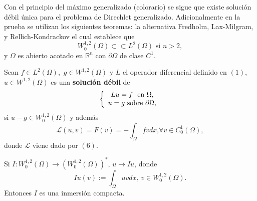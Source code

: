 
%
Con el principio del m\'{a}ximo generalizado (colorario) se sigue que
\linebreak existe soluci\'{o}n d\'{e}bil \'{u}nica para el problema de
Direchlet generalizado. Adicionalmente en la prueba se utilizan los siguientes
teoremas: la alternativa Fredholm, Lax-Milgram, y Rellich-Kondrackov el cual
establece que
\[
W_{0}^{1,2}\left(  \Omega\right)  \subset\subset L^{2}\left(  \Omega\right)
\text{ \ si }n>2,
\]
y $\Omega$ es abierto acotado en $\mathbb{R}^{n}$ con $\partial\Omega$ de
clase $C^{1}$.

\begin{definition}
Sean $f\in L^{2}\left(  \Omega\right)  ,$ $g\in W^{1,2}\left(  \Omega\right)
$ y $L$ el operador diferencial definido en $\left(  1\right)  $, $u\in
W^{1,2}\left(  \Omega\right)  $ es una \textbf{soluci\'{o}n d\'{e}bil} de
\[
\left\{
\begin{array}
[c]{c}%
Lu=f\text{ \ en }\Omega,\\
u=g\text{ sobre }\partial\Omega,
\end{array}
\right.
\]
si $u-g\in W_{0}^{1,2}\left(  \Omega\right)  $ y adem\'{a}s
\begin{equation}
\mathcal{L}\left(  u,v\right)  =F\left(  v\right)  =-\int_{\Omega}fvdx\text{,
}\forall v\in C_{0}^{1}\left(  \Omega\right)  ,\tag{8}%
\end{equation}
donde $\mathcal{L}$ viene dado por $\left(  6\right)  .$
\end{definition}

\begin{lemma}
Si $I:W_{0}^{1,2}\left(  \Omega\right)  \longrightarrow\left(  W_{0}%
^{1,2}\left(  \Omega\right)  \right)  ^{\ast}$, $u\longrightarrow Iu$, donde
\[
Iu\left(  v\right)  :=\int_{\Omega}uvdx\text{, }v\in W_{0}^{1,2}\left(
\Omega\right)  .
\]
Entonces $I$ es una inmersi\'{o}n compacta.
\end{lemma}
